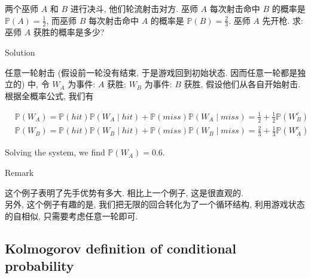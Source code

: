\begin{example}[(Wizards)]

两个巫师 \(\mathit{A}\) 和 \(\mathit{B}\) 进行决斗, 他们轮流射击对方. 巫师 \(\mathit{A}\) 每次射击命中 \(\mathit{B}\) 的概率是 \(\mathbb{P}(\mathit{A}) = \frac{1}{2}\), 而巫师 \(\mathit{B}\) 每次射击命中 \(\mathit{A}\) 的概率是 \(\mathbb{P}(\mathit{B}) = \frac{2}{3}\). 巫师 \(\mathit{A}\) 先开枪. 求: 巫师 \(\mathit{A}\) 获胜的概率是多少?\\

\begin{qlsolution}{Solution}

任意一轮射击 (假设前一轮没有结束, 于是游戏回到初始状态. 因而任意一轮都是独立的) 中, 令 \(\mathit{W}_{\mathit{A}}\) 为事件: \(\mathit{A}\) 获胜; \(\mathit{W}_{\mathit{B}}\) 为事件: \(\mathit{B}\) 获胜, 假设他们从各自开始射击. 根据全概率公式, 我们有

\[\begin{matrix}
 & {\mathbb{P}\left( \mathit{W}_{\mathit{A}} \right) = \mathbb{P}(hit)\mathbb{P}\left( {\mathit{W}_{\mathit{A}} \mid hit} \right) + \mathbb{P}(miss)\mathbb{P}\left( {\mathit{W}_{\mathit{A}} \mid miss} \right) = \frac{1}{2} + \frac{1}{2}\mathbb{P}\left( \mathit{W}_{\mathit{B}}^{\mathit{c}} \right)} \\
 & {\mathbb{P}\left( \mathit{W}_{\mathit{B}} \right) = \mathbb{P}(hit)\mathbb{P}\left( {\mathit{W}_{\mathit{B}} \mid hit} \right) + \mathbb{P}(miss)\mathbb{P}\left( {\mathit{W}_{\mathit{B}} \mid miss} \right) = \frac{2}{3} + \frac{1}{3}\mathbb{P}\left( \mathit{W}_{\mathit{A}}^{\mathit{c}} \right)}
\end{matrix}\]

Solving the system, we find \(\mathbb{P}\left( \mathit{W}_{\mathit{A}} \right) = 0.6\).

\end{qlsolution}

\begin{qlremark}{Remark}

这个例子表明了先手优势有多大. 相比上一个例子, 这是很直观的.\\
另外, 这个例子有趣的是, 我们把无限的回合转化为了一个循环结构, 利用游戏状态的自相似, 只需要考虑任意一轮即可.

\end{qlremark}

\end{example}

\subsection{Kolmogorov definition of conditional probability}\label{kolmogorov-definition-of-conditional-probability}

